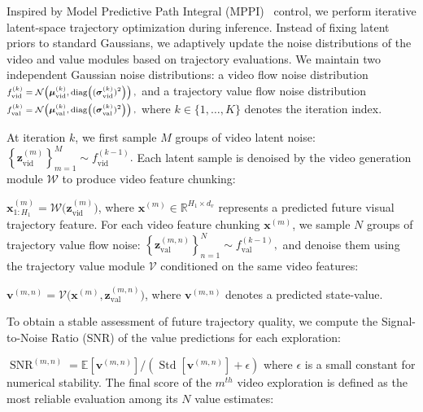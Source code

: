 
Inspired by Model Predictive Path Integral (MPPI)~\citep{williams2015model} control, we perform iterative latent-space trajectory optimization during inference.
Instead of fixing latent priors to standard Gaussians, we adaptively update the noise distributions of the video and value modules based on trajectory evaluations.
We maintain two independent Gaussian noise distributions:
a video flow noise distribution
$
\scriptsize
f_{\mathrm{vid}}^{(k)} = \mathcal{N}\!\left(
\boldsymbol{\mu}_{\mathrm{vid}}^{(k)},
\operatorname{diag}\!\left((\boldsymbol{\sigma}_{\mathrm{vid}}^{(k)})^2\right)
\right),
$
and a trajectory value flow noise distribution
$
\scriptsize
f_{\mathrm{val}}^{(k)} = \mathcal{N}\!\left(
\boldsymbol{\mu}_{\mathrm{val}}^{(k)},
\operatorname{diag}\!\left((\boldsymbol{\sigma}_{\mathrm{val}}^{(k)})^2\right)
\right),
$
where $k \in \{1,\dots,K\}$ denotes the iteration index.

At iteration $k$, we first sample $M$ groups of video latent noise:
$
\scriptstyle
\left\{
\mathbf{z}_{\mathrm{vid}}^{(m)}
\right\}_{m=1}^M
\sim
f_{\mathrm{vid}}^{(k-1)}.
$
Each latent sample is denoised by the video generation module $\mathcal{W}$ to produce video feature chunking:

$
\scriptstyle
\mathbf{x}^{(m)}_{1:H_1} = \mathcal{W}\!\big(\mathbf{z}_{\mathrm{vid}}^{(m)}\big)$,
where $\mathbf{x}^{(m)} \in \mathbb{R}^{H_1 \times d_v}$ represents a predicted future visual trajectory feature.
For each video feature chunking $\mathbf{x}^{(m)}$, we sample $N$ groups of trajectory value flow noise:
$
\scriptstyle
\left\{
\mathbf{z}_{\mathrm{val}}^{(m,n)}
\right\}_{n=1}^N
\sim
f_{\mathrm{val}}^{(k-1)},
$
and denoise them using the trajectory value module $\mathcal{V}$ conditioned on the same video features:

$
\scriptstyle
\mathbf{v}^{(m,n)} = \mathcal{V}\!\big(\mathbf{x}^{(m)}, \mathbf{z}_{\mathrm{val}}^{(m,n)}\big)$,
where $\mathbf{v}^{(m,n)}$ denotes a predicted state-value.

To obtain a stable assessment of future trajectory quality, we compute the Signal-to-Noise Ratio (SNR) of the value predictions for each exploration:

$\scriptstyle \operatorname{SNR}^{(m,n)} = \mathbb{E}\!\left[\mathbf{v}^{(m,n)}\right] / \left(\operatorname{Std}\!\left[\mathbf{v}^{(m,n)}\right] + \epsilon\right)$
where $\epsilon$ is a small constant for numerical stability.
The final score of the $m^{th}$ video exploration is defined as the most reliable evaluation among its $N$ value estimates:

